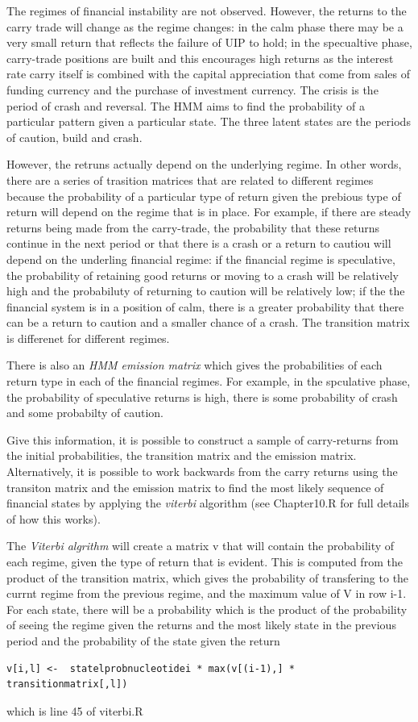 \documentclass[12pt, a4paper, oneside]{article} %
\begin{document}
The regimes of financial instability are not observed.  However, the returns to the carry trade will change as the regime changes:  in the calm phase there may be a very small return that reflects the failure of UIP to hold; in the specualtive phase, carry-trade positions are built and this encourages high returns as the interest rate carry itself is combined with the capital appreciation that come from sales of funding currency and the purchase of investment currency.  The crisis is the period of crash and reversal.  The HMM aims to find the probability of a particular pattern given a particular state. The three latent states are the periods of caution, build and crash.   

However, the retruns actually depend on the underlying regime.  In other words, there are a series of trasition matrices that are related to different regimes because the probability of a particular type of return given the prebious type of return will depend on the regime that is in place.  For example, if there are steady returns being made from the carry-trade, the probability that these returns continue in the next period or that there is a crash or a return to cautiou will depend on the underling financial regime:  if the financial regime is speculative, the probability of retaining good returns or moving to a crash will be relatively high and the probabiluty of returning to caution will be relatively low; if the the financial system is in a position of calm, there is a greater probability that there can be a return to caution and a smaller chance of a crash.  The transition matrix is differenet for different regimes. 

There is also an \emph{HMM emission matrix} which gives the probabilities of each return type in each of the financial regimes. For example, in the spculative phase, the probability of speculative returns is high, there is some probability of crash and some probabilty of caution. 

Give this information, it is possible to construct a sample of carry-returns from the initial probabilities, the transition matrix and the emission matrix.  Alternatively, it is possible to work backwards from the carry returns using the  transiton matrix and the emission matrix to find the most likely sequence of financial states by applying the \emph{viterbi} algorithm (see Chapter10.R for full details of how this works).  

The \emph{Viterbi algrithm} will create a matrix v that will contain the probability of each regime, given the type of return that is evident. This is computed from the product of the transition matrix, which gives the probability of transfering to the currnt regime from the previous regime, and the maximum value of V in row i-1.  For each state, there will be a probability which is the product of the probability of seeing the regime given the returns and the most likely state in the previous period and the probability of the state given the return \begin{verbatim}v[i,l] <-  statelprobnucleotidei * max(v[(i-1),] * transitionmatrix[,l])\end{verbatim} which is line 45 of viterbi.R
\end{document}
